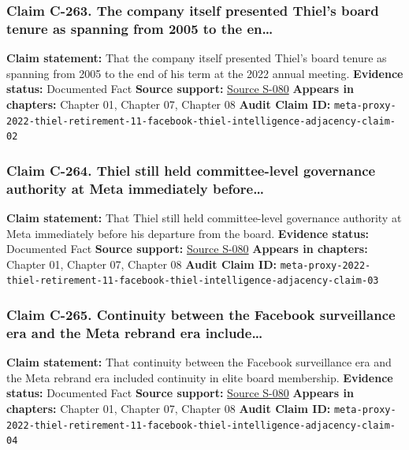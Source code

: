 \documentclass[
  american,
  11pt,
  letterpaper,
]{article}
\begin{document}
\subsubsection{Claim C-263. The company itself presented Thiel's board
tenure as spanning from 2005 to the
en\ldots{}}\label{claim-c-263-the-company-itself-presented-thiel-s-board-tenure-as-spanning-from-2005-to-the-en}

\textbf{Claim statement:} That the company itself presented Thiel's
board tenure as spanning from 2005 to the end of his term at the 2022
annual meeting. \textbf{Evidence status:} Documented Fact \textbf{Source
support:}
\hyperref[source-s-080-meta-platforms-inc-2022-definitive-proxy-statement]{Source
S-080} \textbf{Appears in chapters:} Chapter 01, Chapter 07, Chapter 08
\textbf{Audit Claim ID:}
\texttt{meta-proxy-2022-thiel-retirement-11-facebook-thiel-intelligence-adjacency-claim-02}

\subsubsection{Claim C-264. Thiel still held committee-level governance
authority at Meta immediately
before\ldots{}}\label{claim-c-264-thiel-still-held-committee-level-governance-authority-at-meta-immediately-before}

\textbf{Claim statement:} That Thiel still held committee-level
governance authority at Meta immediately before his departure from the
board. \textbf{Evidence status:} Documented Fact \textbf{Source
support:}
\hyperref[source-s-080-meta-platforms-inc-2022-definitive-proxy-statement]{Source
S-080} \textbf{Appears in chapters:} Chapter 01, Chapter 07, Chapter 08
\textbf{Audit Claim ID:}
\texttt{meta-proxy-2022-thiel-retirement-11-facebook-thiel-intelligence-adjacency-claim-03}

\subsubsection{Claim C-265. Continuity between the Facebook surveillance
era and the Meta rebrand era
include\ldots{}}\label{claim-c-265-continuity-between-the-facebook-surveillance-era-and-the-meta-rebrand-era-include}

\textbf{Claim statement:} That continuity between the Facebook
surveillance era and the Meta rebrand era included continuity in elite
board membership. \textbf{Evidence status:} Documented Fact
\textbf{Source support:}
\hyperref[source-s-080-meta-platforms-inc-2022-definitive-proxy-statement]{Source
S-080} \textbf{Appears in chapters:} Chapter 01, Chapter 07, Chapter 08
\textbf{Audit Claim ID:}
\texttt{meta-proxy-2022-thiel-retirement-11-facebook-thiel-intelligence-adjacency-claim-04}
\end{document}
